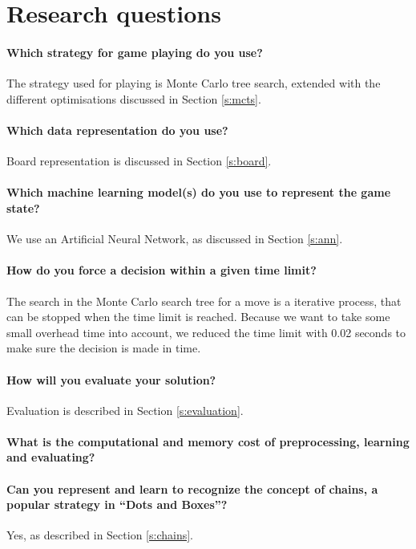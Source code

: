 \section{Research questions}
\paragraph{Which strategy for game playing do you use?} The strategy used for playing is Monte Carlo tree search, extended with the different optimisations discussed in Section \ref{s:mcts}.
	
\paragraph{Which data representation do you use?} Board representation is discussed in Section \ref{s:board}.

\paragraph{Which machine learning model(s) do you use to represent the game state?} We use an Artificial Neural Network, as discussed in Section \ref{s:ann}.
	
\paragraph{How do you force a decision within a given time limit?} The search in the Monte Carlo search tree for a move is a iterative process, that can be stopped when the time limit is reached. Because we want to take some small overhead time into account, we reduced the time limit with 0.02 seconds to make sure the decision is made in time.
	
\paragraph{How will you evaluate your solution?} Evaluation is described in Section \ref{s:evaluation}.
	
\paragraph{What is the computational and memory cost of preprocessing, learning and evaluating?} %
	
\paragraph{Can you represent and learn to recognize the concept of chains, a popular strategy in ``Dots and Boxes''?} Yes, as described in Section \ref{s:chains}.
	
